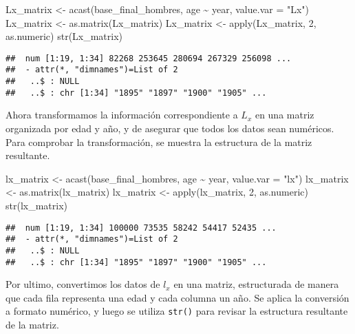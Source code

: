 \documentclass[
]{article}
\newenvironment{Shaded}{\begin{snugshade}}{\end{snugshade}}
\newcommand{\AttributeTok}[1]{\textcolor[rgb]{0.77,0.63,0.00}{#1}}
\newcommand{\DecValTok}[1]{\textcolor[rgb]{0.00,0.00,0.81}{#1}}
\newcommand{\FunctionTok}[1]{\textcolor[rgb]{0.00,0.00,0.00}{#1}}
\newcommand{\NormalTok}[1]{#1}
\newcommand{\OtherTok}[1]{\textcolor[rgb]{0.56,0.35,0.01}{#1}}
\newcommand{\SpecialCharTok}[1]{\textcolor[rgb]{0.00,0.00,0.00}{#1}}
\newcommand{\StringTok}[1]{\textcolor[rgb]{0.31,0.60,0.02}{#1}}
\begin{document}
\begin{Shaded}
\begin{Highlighting}[]
\NormalTok{Lx\_matrix }\OtherTok{\textless{}{-}} \FunctionTok{acast}\NormalTok{(base\_final\_hombres, age }\SpecialCharTok{\textasciitilde{}}\NormalTok{ year, }\AttributeTok{value.var =} \StringTok{"Lx"}\NormalTok{)}
\NormalTok{Lx\_matrix }\OtherTok{\textless{}{-}} \FunctionTok{as.matrix}\NormalTok{(Lx\_matrix)}
\NormalTok{Lx\_matrix }\OtherTok{\textless{}{-}} \FunctionTok{apply}\NormalTok{(Lx\_matrix, }\DecValTok{2}\NormalTok{, as.numeric)}
\FunctionTok{str}\NormalTok{(Lx\_matrix)}
\end{Highlighting}
\end{Shaded}

\begin{verbatim}
##  num [1:19, 1:34] 82268 253645 280694 267329 256098 ...
##  - attr(*, "dimnames")=List of 2
##   ..$ : NULL
##   ..$ : chr [1:34] "1895" "1897" "1900" "1905" ...
\end{verbatim}

Ahora transformamos la información correspondiente a \(L_x\) en una
matriz organizada por edad y año, y de asegurar que todos los datos sean
numéricos. Para comprobar la transformación, se muestra la estructura de
la matriz resultante.

\begin{Shaded}
\begin{Highlighting}[]
\NormalTok{lx\_matrix }\OtherTok{\textless{}{-}} \FunctionTok{acast}\NormalTok{(base\_final\_hombres, age }\SpecialCharTok{\textasciitilde{}}\NormalTok{ year, }\AttributeTok{value.var =} \StringTok{"lx"}\NormalTok{)}
\NormalTok{lx\_matrix }\OtherTok{\textless{}{-}} \FunctionTok{as.matrix}\NormalTok{(lx\_matrix)}
\NormalTok{lx\_matrix }\OtherTok{\textless{}{-}} \FunctionTok{apply}\NormalTok{(lx\_matrix, }\DecValTok{2}\NormalTok{, as.numeric)}
\FunctionTok{str}\NormalTok{(lx\_matrix)}
\end{Highlighting}
\end{Shaded}

\begin{verbatim}
##  num [1:19, 1:34] 100000 73535 58242 54417 52435 ...
##  - attr(*, "dimnames")=List of 2
##   ..$ : NULL
##   ..$ : chr [1:34] "1895" "1897" "1900" "1905" ...
\end{verbatim}

Por ultimo, convertimos los datos de \(l_x\) en una matriz, estructurada
de manera que cada fila representa una edad y cada columna un año. Se
aplica la conversión a formato numérico, y luego se utiliza
\texttt{str()} para revisar la estructura resultante de la matriz.
\end{document}

